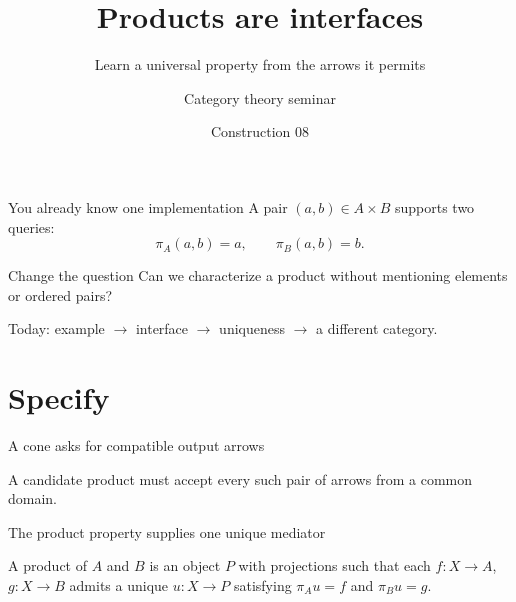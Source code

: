 \documentclass[10pt,aspectratio=43]{beamer}
\title{Products are interfaces}
\subtitle{Learn a universal property from the arrows it permits}
\author{Category theory seminar}
\date{Construction 08}
\begin{document}
\begin{frame}{You already know one implementation}
A pair $(a,b)\in A\times B$ supports two queries:
\[
 \pi_A(a,b)=a,\qquad\pi_B(a,b)=b.
\]
\begin{block}{Change the question}
Can we characterize a product without mentioning elements or ordered pairs?
\end{block}
\small Today: example $\to$ interface $\to$ uniqueness $\to$ a different category.
\end{frame}
\begin{frame}[plain]\titlepage\end{frame}
\section{Specify}
\begin{frame}[fragile]{A cone asks for compatible output arrows}
\begin{center}
\end{center}
\medskip
A candidate product must accept every such pair of arrows from a common domain.
\end{frame}
\begin{frame}[fragile]{The product property supplies one unique mediator}
\begin{definition}
A product of $A$ and $B$ is an object $P$ with projections such that each $f:X\to A$, $g:X\to B$ admits a unique $u:X\to P$ satisfying $\pi_Au=f$ and $\pi_Bu=g$.
\end{definition}
\begin{center}
\end{center}
\end{frame}
\end{document}

